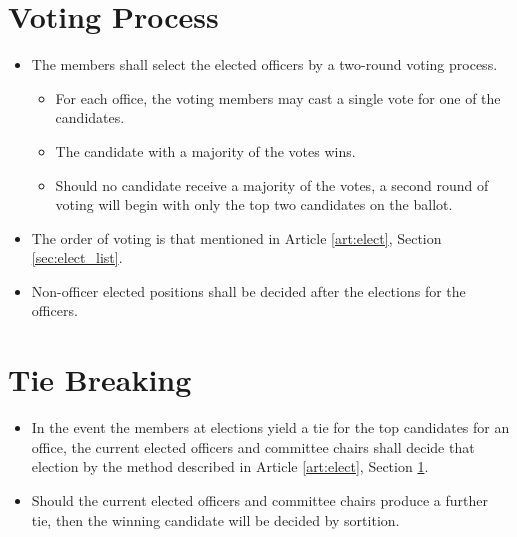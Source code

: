 \documentclass[12pt]{constitution}
\begin{document}
\section{Voting Process}
\label{sec:elect_vote}
\begin{itemize}
    \item The members shall select the elected officers by a two-round voting process.
    \begin{itemize}
        \item For each office, the voting members may cast a single vote for one of the candidates.
        \item The candidate with a majority of the votes wins.
        \item Should no candidate receive a majority of the votes, a second round of voting will begin with only the top two candidates on the ballot.
    \end{itemize}
    \item The order of voting is that mentioned in Article \ref{art:elect}, Section \ref{sec:elect_list}.
    \item Non-officer elected positions shall be decided after the elections for the officers.
\end{itemize}

\section{Tie Breaking}
\label{sec:elect_tie}
\begin{itemize}
    \item In the event the members at elections yield a tie for the top candidates for an office, the current elected officers and committee chairs shall decide that election by the method described in Article \ref{art:elect}, Section \ref{sec:elect_vote}.
    \item Should the current elected officers and committee chairs produce a further tie, then the winning candidate will be decided by sortition.
\end{itemize}
\end{document}
